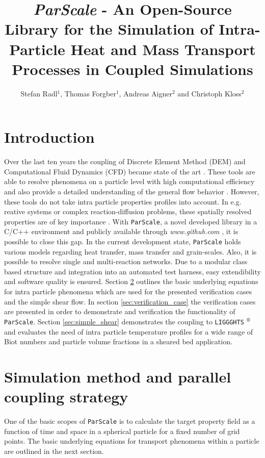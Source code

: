 \documentclass{particles2015}
\title{\textit{ParScale} - An Open-Source Library for the Simulation of Intra-Particle Heat and Mass Transport Processes in Coupled Simulations}
\author{Stefan Radl$^{1}$, Thomas Forgber$^{1}$, Andreas Aigner$^{2}$ and Christoph Kloss$^{2}$}
\begin{document}
\maketitle
\thispagestyle{empty}

\section{Introduction}
\label{sec:introduction}
Over the last ten years the coupling of Discrete Element Method (DEM) and Computational Fluid Dynamics (CFD) became state of the art \cite{Kloss2012}. These tools are able to resolve phenomena on a particle level with high computational efficiency and also provide a detailed understanding of the general flow behavior \cite{Wu2014}. However, these tools do not take intra particle properties profiles into account. In e.g. reative systems or complex reaction-diffusion problems, these spatially resolved properties are of key importance \cite{Dixon2007}. With \texttt{ParScale}, a novel developed library in a C/C++ environment and publicly available through \textit{www.github.com} \cite{ParScale_Public}, it is possible to close this gap. In the current development state, \texttt{ParScale} holds various models regarding heat transfer, mass transfer and grain-scales. Also, it is possible to resolve single and multi-reaction networks. Due to a modular class based structure and integration into an automated test harness, easy extendibility and software quality is ensured. Section \ref{sec:simu_method} outlines the basic underlying equations for intra particle phenomena which are used for the presented verification cases and the simple shear flow. In section \ref{sec:verification_case} the verification cases are presented in order to demonstrate and verification the functionality of \texttt{ParScale}. Section \ref{sec:simple_shear} demonstrates the coupling to \texttt{LIGGGHTS} $\textsuperscript{\textregistered}$ and evaluates the need of intra particle temperature profiles for a wide range of Biot numbers and particle volume fractions in a sheared bed application. 

\section{Simulation method and parallel coupling strategy}
\label{sec:simu_method}
One of the basic scopes of \texttt{ParScale} is to calculate the target property field as a function of time and space in a spherical particle for a fixed number of grid points. The basic underlying equations for transport phenomena within a particle are outlined in the next section.
\end{document}
